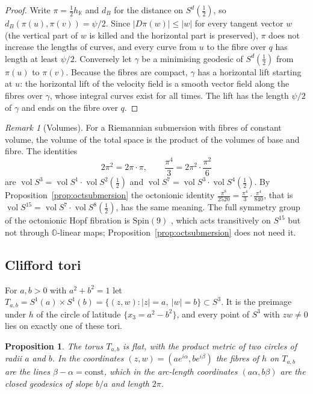 \documentclass[11pt]{amsart}
\numberwithin{equation}{section}
\theoremstyle{plain}
\newtheorem{proposition}[theorem]{Proposition}
\theoremstyle{definition}
\theoremstyle{remark}
\newtheorem{remark}[theorem]{Remark}
\newcommand{\Oc}{\mathbb{O}}
\newcommand{\K}{\mathbb{K}}
\begin{document}
\begin{proof}
Write $\pi=\tfrac12h_\K$ and $d_B$ for the distance on $S^d(\tfrac12)$, so $d_B(\pi(u),\pi(v))=\psi/2$. Since $|D\pi(w)|\le|w|$ for every tangent vector $w$ (the vertical part of $w$ is killed and the horizontal part is preserved), $\pi$ does not increase the lengths of curves, and every curve from $u$ to the fibre over $q$ has length at least $\psi/2$. Conversely let $\gamma$ be a minimising geodesic of $S^d(\tfrac12)$ from $\pi(u)$ to $\pi(v)$. Because the fibres are compact, $\gamma$ has a horizontal lift starting at $u$: the horizontal lift of the velocity field is a smooth vector field along the fibres over $\gamma$, whose integral curves exist for all times. The lift has the length $\psi/2$ of $\gamma$ and ends on the fibre over $q$.
\end{proof}

\begin{remark}[Volumes]
For a Riemannian submersion with fibres of constant volume, the volume of the total space is the product of the volumes of base and fibre. The identities
\[
2\pi^2=2\pi\cdot\pi,\qquad \frac{\pi^4}{3}=2\pi^2\cdot\frac{\pi^2}{6}
\]
are $\operatorname{vol}S^3=\operatorname{vol}S^1\cdot\operatorname{vol}S^2(\tfrac12)$ and $\operatorname{vol}S^7=\operatorname{vol}S^3\cdot\operatorname{vol}S^4(\tfrac12)$. By Proposition~\ref{prop:octsubmersion} the octonionic identity $\frac{\pi^8}{2520}=\frac{\pi^4}{3}\cdot\frac{\pi^4}{840}$, that is $\operatorname{vol}S^{15}=\operatorname{vol}S^7\cdot\operatorname{vol}S^8(\tfrac12)$, has the same meaning. The full symmetry group of the octonionic Hopf fibration is $\mathrm{Spin}(9)$ \cite{GWZ86}, which acts transitively on $S^{15}$ but not through $\Oc$-linear maps; Proposition~\ref{prop:octsubmersion} does not need it.
\end{remark}

\subsection{Clifford tori}\label{sec:clifford}

For $a,b>0$ with $a^2+b^2=1$ let $T_{a,b}=S^1(a)\times S^1(b)=\{(z,w):|z|=a,\ |w|=b\}\subset S^3$. It is the preimage under $h$ of the circle of latitude $\{x_3=a^2-b^2\}$, and every point of $S^3$ with $zw\neq0$ lies on exactly one of these tori.

\begin{proposition}\label{prop:clifford}
The torus $T_{a,b}$ is flat, with the product metric of two circles of radii $a$ and $b$. In the coordinates $(z,w)=(ae^{i\alpha},be^{i\beta})$ the fibres of $h$ on $T_{a,b}$ are the lines $\beta-\alpha=\mathrm{const}$, which in the arc-length coordinates $(a\alpha,b\beta)$ are the closed geodesics of slope $b/a$ and length $2\pi$.
\end{proposition}
\end{document}
